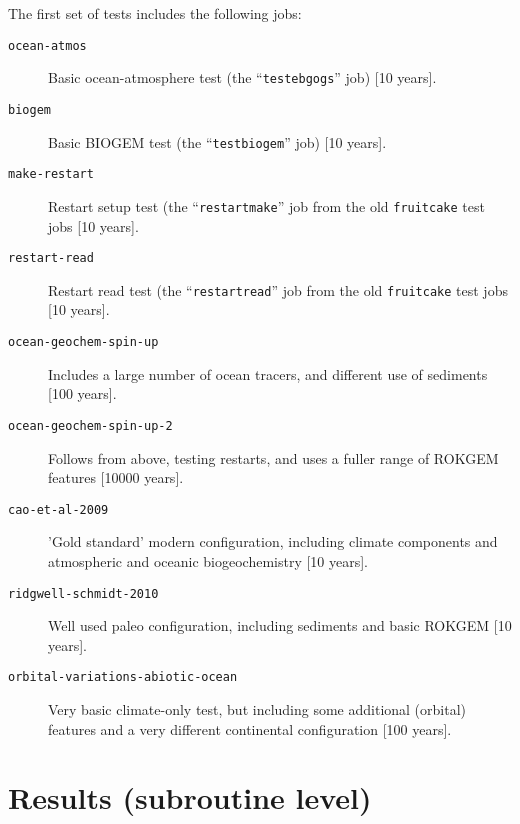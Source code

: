 \documentclass[a4paper,10pt,article]{memoir}
\begin{document}
The first set of tests includes the following jobs:
\begin{description}
  \item[\texttt{ocean-atmos}]{Basic ocean-atmosphere test (the
    ``\texttt{testebgogs}'' job) [10 years].}
  \item[\texttt{biogem}]{Basic BIOGEM test (the
    ``\texttt{testbiogem}'' job) [10 years].}
  \item[\texttt{make-restart}]{Restart setup test (the
    ``\texttt{restartmake}'' job from the old \texttt{fruitcake} test
    jobs [10 years].}
  \item[\texttt{restart-read}]{Restart read test (the
    ``\texttt{restartread}'' job from the old \texttt{fruitcake} test
    jobs [10 years].}
  \item[\texttt{ocean-geochem-spin-up}]{Includes a large number of
    ocean tracers, and different use of sediments [100 years].}
  \item[\texttt{ocean-geochem-spin-up-2}]{Follows from above, testing
    restarts, and uses a fuller range of ROKGEM features [10000
      years].}
  \item[\texttt{cao-et-al-2009}]{'Gold standard' modern configuration,
    including climate components and atmospheric and oceanic
    biogeochemistry [10 years].}
  \item[\texttt{ridgwell-schmidt-2010}]{Well used paleo configuration,
    including sediments and basic ROKGEM [10 years].}
  \item[\texttt{orbital-variations-abiotic-ocean}]{Very basic
    climate-only test, but including some additional (orbital)
    features and a very different continental configuration [100
      years].}
\end{description}

\section{Results (subroutine level)}
\end{document}
